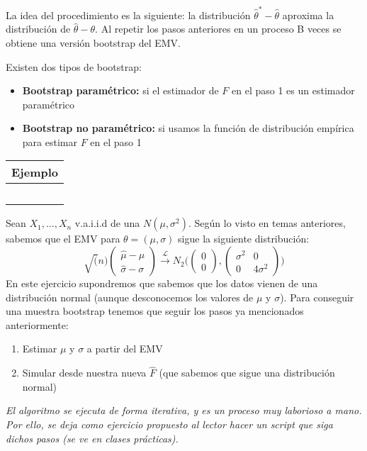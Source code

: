 La idea del procedimiento es la siguiente: la distribución $\hat\theta^*-\hat\theta$ aproxima la distribución de $\hat\theta-\theta$. Al repetir los pasos anteriores en un proceso B veces se obtiene una versión bootstrap del EMV.

Existen dos tipos de bootstrap:
\begin{itemize}
    \item \textbf{Bootstrap paramétrico:} si el estimador de $F$ en el paso 1 es un estimador paramétrico
    \item \textbf{Bootstrap no paramétrico:} si usamos la función de distribución empírica para estimar $F$ en el paso 1
\end{itemize}

\hspace{-1cm}\noindent\begin{tabular}{r}
    \textbf{Ejemplo} \\ \hline \ \\
\end{tabular}

Sean $X_1,\dots,X_n$ v.a.i.i.d de una $N(\mu,\sigma^2)$. Según lo visto en temas anteriores, sabemos que el EMV para $\theta=(\mu,\sigma)$ sigue la siguiente distribución:
$$\sqrt(n)\begin{pmatrix}
        \hat\mu-\mu \\
        \hat\sigma-\sigma
    \end{pmatrix} \overset{\mathcal{L}}{\longrightarrow}N_2\Bigg(\begin{pmatrix}
            0 \\ 0 \end{pmatrix},\begin{pmatrix}
            \sigma^2 & 0 \\ 0 & 4\sigma^2
        \end{pmatrix}\Bigg)$$
En este ejercicio supondremos que sabemos que los datos vienen de una distribución normal (aunque desconocemos los valores de $\mu$ y $\sigma$). Para conseguir una muestra bootstrap tenemos que seguir los pasos ya mencionados anteriormente:
\begin{enumerate}
    \item Estimar $\mu$ y $\sigma$ a partir del EMV
    \item Simular desde nuestra nueva $\hat F$ (que sabemos que sigue una distribución normal)
\end{enumerate}
\textit{El algoritmo se ejecuta de forma iterativa, y es un proceso muy laborioso a mano. Por ello, se deja como ejercicio propuesto al lector hacer un script que siga dichos pasos (se ve en clases prácticas).}\\

